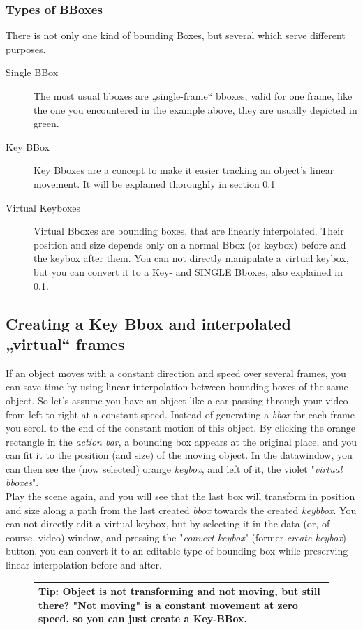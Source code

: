    \subsubsection{Types of BBoxes}
      There is not only one kind of bounding Boxes, but several which serve different purposes.
      \begin{description}
         \item[Single BBox]The most usual bboxes are „single-frame“ bboxes, valid for one frame, like the one you encountered in the example above, they are usually depicted in green.
         \item[Key BBox]Key Bboxes are a concept to make it easier tracking an object's linear movement. It will be explained thoroughly in section \ref{interpolation} 
         \item[Virtual Keyboxes]Virtual Bboxes are bounding boxes, that are linearly interpolated. Their position and size depends only on a normal Bbox (or keybox) before and the keybox after them. You can not directly manipulate a virtual keybox, but you can convert it to a Key- and SINGLE Bboxes, also explained in \ref{interpolation}. 
      \end{description}


\subsection{Creating a Key Bbox and interpolated „virtual“ frames}\label{interpolation}
If an object moves with a constant direction and speed over several frames, you can save time by using linear interpolation between bounding boxes of the same object. So let's assume you have an object like a car passing through your video from left to right at a constant speed. Instead of generating a \emph{bbox} for each frame you scroll to the end of the constant motion of this object. By clicking the orange rectangle in the \emph{action bar}, a bounding box appears at the original place, and you can fit it to the position (and size) of the moving object. In the datawindow, you can then see the (now selected) orange \emph{keybox}, and left of it, the violet "\emph{virtual bboxes}".
\\
Play the scene again, and you will see that the last box will transform in position and size along a path from the last created \emph{bbox} towards the created \emph{keybbox}.
You can not directly edit a virtual keybox, but by selecting it in the data (or, of course, video) window, and pressing the "\emph{convert keybox}" (former \emph{create keybox}) button, you can convert it to an editable type of bounding box while preserving linear interpolation before and after.
\begin{figure}[H]
   \begin{tabular}{|p{}|}
   \hline
   Tip: Object is not transforming and not moving, but still there? "Not moving" is a constant movement at zero speed, so you can just create a Key-BBox.\\
   \hline
   \end{tabular}
\end{figure}

